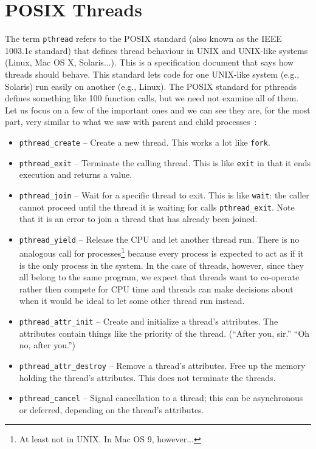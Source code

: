 




\section*{POSIX Threads}

The term \texttt{pthread} refers to the POSIX standard (also known as the IEEE 1003.1c standard) that defines thread behaviour in UNIX and UNIX-like systems (Linux, Mac OS X, Solaris...). This is a specification document that says how threads should behave. This standard lets code for one UNIX-like system (e.g., Solaris) run easily on another (e.g., Linux). The POSIX standard for pthreads defines something like 100 function calls, but we need not examine all of them. Let us focus on a few of the important ones and we can see they are, for the most part, very similar to what we saw with parent and child processes~\cite{mos}:

\begin{itemize}
	\item \texttt{pthread\_create} -- Create a new thread. This works a lot like \texttt{fork}.
	\item \texttt{pthread\_exit} -- Terminate the calling thread. This is like \texttt{exit} in that it ends execution and returns a value.
	\item \texttt{pthread\_join} -- Wait for a specific thread to exit. This is like \texttt{wait}: the caller cannot proceed until the thread it is waiting for calls \texttt{pthread\_exit}. Note that it is an error to join a thread that has already been joined.
	\item \texttt{pthread\_yield} -- Release the CPU and let another thread run. There is no analogous call for processes\footnote{At least not in UNIX. In Mac OS 9, however...} because every process is expected to act as if it is the only process in the system. In the case of threads, however, since they all belong to the same program, we expect that threads want to co-operate rather then compete for CPU time and threads can make decisions about when it would be ideal to let some other thread run instead.
	\item \texttt{pthread\_attr\_init} -- Create and initialize a thread's attributes. The attributes contain things like the priority of the thread. (``After you, sir.'' ``Oh no, after you.'')
	\item \texttt{pthread\_attr\_destroy} -- Remove a thread's attributes. Free up the memory holding the thread's attributes. This does not terminate the threads.
	\item \texttt{pthread\_cancel} -- Signal cancellation to a thread; this can be asynchronous or deferred, depending on the thread's attributes.
\end{itemize}


